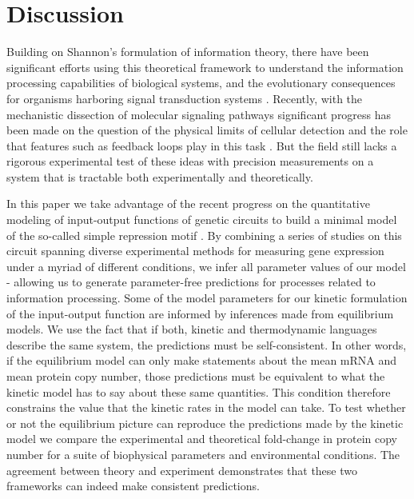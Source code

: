 \section*{Discussion}

Building on Shannon's formulation of information theory, there have been
significant efforts using this theoretical framework to understand the
information processing capabilities of biological systems, and the evolutionary
consequences for organisms harboring signal transduction systems
\cite{Bergstrom2004, Taylor2007a, Tkacik2008, Polani2009, Nemenman2010,
Rivoire2011}. Recently, with the mechanistic dissection of molecular signaling
pathways significant progress has been made on the question of the physical
limits of cellular detection and the role that features such as feedback loops
play in this task \cite{Bialek2005, Libby2007, Tkacik2011, Rhee2012a,
Voliotis2014a}. But the field still lacks a rigorous experimental test of these
ideas with precision measurements on a system that is tractable both
experimentally and theoretically.

In this paper we take advantage of the recent progress on the quantitative
modeling of input-output functions of genetic circuits to build a minimal model
of the so-called simple repression motif \cite{Phillips2019}. By combining a
series of studies on this circuit spanning diverse experimental methods for
measuring gene expression under a myriad of different conditions, we infer all
parameter values of our model - allowing us to generate parameter-free
predictions for processes related to information processing. Some of the model
parameters for our kinetic formulation of the input-output function are informed
by inferences made from equilibrium models. We use the fact that if both,
kinetic and thermodynamic languages describe the same system, the predictions
must be self-consistent. In other words, if the equilibrium model can only make
statements about the mean mRNA and mean protein copy number, those predictions
must be equivalent to what the kinetic model has to say about these same
quantities. This condition therefore constrains the value that the kinetic rates
in the model can take. To test whether or not the equilibrium picture can
reproduce the predictions made by the kinetic model we compare the experimental
and theoretical fold-change in protein copy number for a suite of biophysical
parameters and environmental conditions. The agreement between theory and
experiment demonstrates that these two frameworks can indeed make consistent
predictions.

